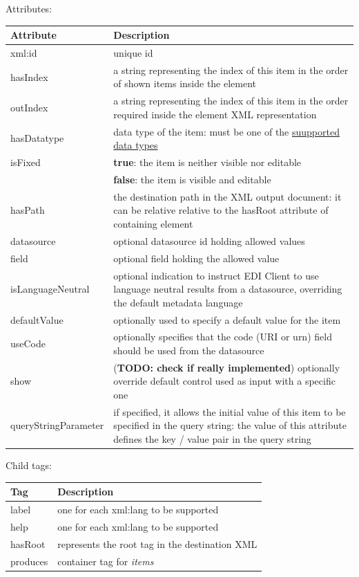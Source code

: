 \documentclass[10pt]{article}
\begin{document}
	Attributes:
\begin{center}
	\begin{tabular}{ | p{} | p{} | }
		\hline
		Attribute & Description \\ 
		\hline
		xml:id & unique id \\
		\hline
		hasIndex & a string representing the index of this item in the order of shown items inside the element \\
		\hline
		outIndex & a string representing the index of this item in the order required inside the element XML representation \\
		\hline
		hasDatatype & data type of the item: must be one of the \hyperref[datatypes]{suupported data types} \\
		\hline
		isFixed & \textbf{true}: the item is neither visible nor editable \\
		& \textbf{false}: the item is visible and editable \\
		\hline
		hasPath & the destination path in the XML output document: it can be relative relative to the hasRoot attribute of containing element \\
		\hline
		datasource & optional datasource id holding allowed values \\
		\hline
		field & optional field holding the allowed value \\
				\hline
		isLanguageNeutral & optional indication to instruct EDI Client to use language neutral results from a datasource, overriding the default metadata language \\
		\hline
		defaultValue & optionally used to 		specify a default value for the item \\
		\hline
		useCode & optionally specifies that the code (URI or urn) field should be used from the datasource \\
		\hline
		show & (\textbf{TODO: check if really implemented}) optionally override default control used as input with a specific one \\
		\hline
		queryStringParameter & if specified, it allows the initial value of this item to be specified in the query string: the value of this attribute defines the key / value pair in the query string \\
		\hline
	\end{tabular}
\end{center}

Child tags:
\begin{center}
	\begin{tabular}{ | p{} | p{} | }
		\hline
		Tag & Description \\ 
		\hline
		label & one for each xml:lang to be supported \\
		help & one for each xml:lang to be supported \\
		\hline
		hasRoot & represents the root tag in the destination XML \\
		\hline
		produces & container tag for \textit{items} \\
		\hline
		
	\end{tabular}
\end{center}
\end{document}
